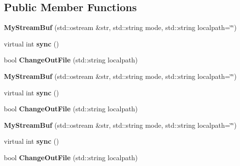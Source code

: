 \subsection*{Public Member Functions}
\begin{DoxyCompactItemize}
\item 
\hypertarget{classLogging_1_1MyStreamBuf_a05b8632ac8a69efc34144266fdef3441}{{\bfseries My\-Stream\-Buf} (std\-::ostream \&str, std\-::string mode, std\-::string localpath=\char`\"{}\char`\"{})}\label{classLogging_1_1MyStreamBuf_a05b8632ac8a69efc34144266fdef3441}

\item 
\hypertarget{classLogging_1_1MyStreamBuf_ae06a0c7f0f8c72ceb342630a819457cd}{virtual int {\bfseries sync} ()}\label{classLogging_1_1MyStreamBuf_ae06a0c7f0f8c72ceb342630a819457cd}

\item 
\hypertarget{classLogging_1_1MyStreamBuf_a400c762f73da994dd496b7234a0953fd}{bool {\bfseries Change\-Out\-File} (std\-::string localpath)}\label{classLogging_1_1MyStreamBuf_a400c762f73da994dd496b7234a0953fd}

\item 
\hypertarget{classLogging_1_1MyStreamBuf_a05b8632ac8a69efc34144266fdef3441}{{\bfseries My\-Stream\-Buf} (std\-::ostream \&str, std\-::string mode, std\-::string localpath=\char`\"{}\char`\"{})}\label{classLogging_1_1MyStreamBuf_a05b8632ac8a69efc34144266fdef3441}

\item 
\hypertarget{classLogging_1_1MyStreamBuf_ac8873bb6a99f361cc6fcd04f651e0e77}{virtual int {\bfseries sync} ()}\label{classLogging_1_1MyStreamBuf_ac8873bb6a99f361cc6fcd04f651e0e77}

\item 
\hypertarget{classLogging_1_1MyStreamBuf_a400c762f73da994dd496b7234a0953fd}{bool {\bfseries Change\-Out\-File} (std\-::string localpath)}\label{classLogging_1_1MyStreamBuf_a400c762f73da994dd496b7234a0953fd}

\item 
\hypertarget{classLogging_1_1MyStreamBuf_a05b8632ac8a69efc34144266fdef3441}{{\bfseries My\-Stream\-Buf} (std\-::ostream \&str, std\-::string mode, std\-::string localpath=\char`\"{}\char`\"{})}\label{classLogging_1_1MyStreamBuf_a05b8632ac8a69efc34144266fdef3441}

\item 
\hypertarget{classLogging_1_1MyStreamBuf_ac8873bb6a99f361cc6fcd04f651e0e77}{virtual int {\bfseries sync} ()}\label{classLogging_1_1MyStreamBuf_ac8873bb6a99f361cc6fcd04f651e0e77}

\item 
\hypertarget{classLogging_1_1MyStreamBuf_a400c762f73da994dd496b7234a0953fd}{bool {\bfseries Change\-Out\-File} (std\-::string localpath)}\label{classLogging_1_1MyStreamBuf_a400c762f73da994dd496b7234a0953fd}

\end{DoxyCompactItemize}
